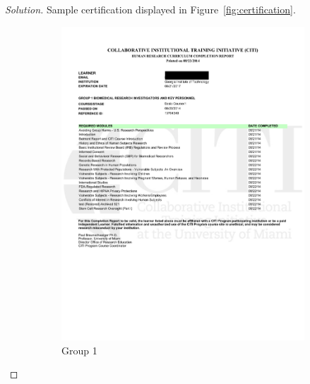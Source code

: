 \documentclass[12pt]{article}
\newenvironment{solution}
  {\begin{proof}[Solution]}
  {\end{proof}}
\begin{document}
\begin{solution}
Sample certification displayed in Figure~\ref{fig:certification}.


\begin{figure}[h]
\begin{subfigure}[b]{0.5\textwidth}
\includegraphics[trim=0 200 0 0,width=\textwidth]{group1.pdf}
\caption{Group 1}
\end{subfigure}
\begin{subfigure}[b]{0.5\textwidth}

\end{subfigure}
\end{figure}
\end{solution}
\end{document}
